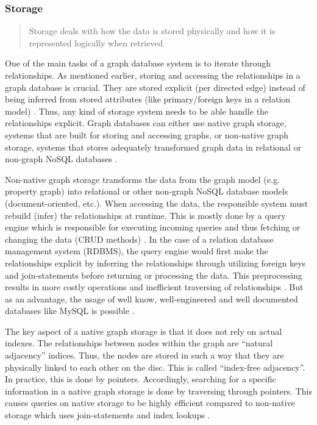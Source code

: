 \subsubsection{Storage}
\blockquote{Storage deals with how the data is stored physically and how it is represented logically when retrieved}\autocite{maheshlal2015}

One of the main tasks of a graph database system is to iterate through relationships. As mentioned earlier, storing and accessing the relationships in a graph database is crucial. They are stored explicit (per directed edge) instead of being inferred from stored attributes (like primary/foreign keys in a relation model) \autocite{maheshlal2015} . Thus, any kind of storage system needs to be able handle the relationships explicit. Graph databases can either use native graph storage, systems that are built for storing and accessing graphs, or non-native graph storage, systems that stores adequately transformed graph data in relational or non-graph NoSQL databases \autocite{graphdb2015}.


Non-native graph storage transforms the data from the graph model (e.g. property graph) into relational or other non-graph NoSQL database models (document-oriented, etc.). When accessing the data, the responsible system must rebuild (infer) the relationships at runtime. This is mostly done by a query engine which is responsible for executing incoming queries and thus fetching or changing the data (CRUD methods) \autocite{maheshlal2015} . In the case of a relation database management system (RDBMS), the query engine would first make the relationships explicit by inferring the relationships through utilizing foreign keys and join-statements before returning or processing the data. This preprocessing results in more costly operations and inefficient traversing of relationships \autocite{maheshlal2015} . But as an advantage, the usage of well know, well-engineered and well documented databases like MySQL is possible \autocite{graphdb2015}.


The key aspect of a native graph storage is that it does not rely on actual indexes. The relationships between nodes within the graph are “natural adjacency”\autocite{graphdb2015}  indices. Thus, the nodes are stored in such a way that they are physically linked to each other on the disc. This is called “index-free adjacency”\autocite{graphdb2015}. In practice, this is done by pointers. Accordingly, searching for a specific information in a native graph storage is done by traversing through pointers. This causes queries on native storage to be highly efficient compared to non-native storage which uses join-statements and index lookups \autocite{graphdb2015} .

